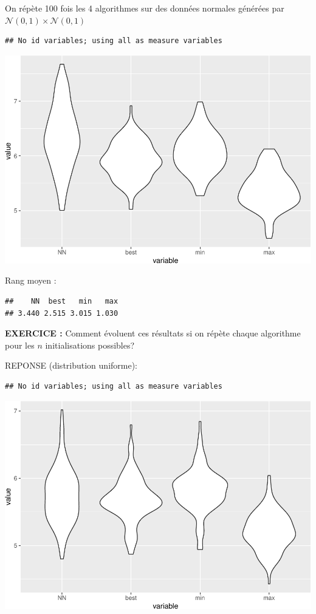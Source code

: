 \documentclass[
]{article}
\begin{document}
On répète 100 fois les 4 algorithmes sur des données normales générées
par \(\mathcal{N}(0,1) \times \mathcal{N}(0,1)\)

\begin{verbatim}
## No id variables; using all as measure variables
\end{verbatim}

\includegraphics{rapport_TSP_files/figure-latex/unnamed-chunk-13-1.pdf}

Rang moyen :

\begin{verbatim}
##    NN  best   min   max 
## 3.440 2.515 3.015 1.030
\end{verbatim}

\textbf{EXERCICE :} Comment évoluent ces résultats si on répète chaque
algorithme pour les \(n\) initialisations possibles?

REPONSE (distribution uniforme):

\begin{verbatim}
## No id variables; using all as measure variables
\end{verbatim}

\includegraphics{rapport_TSP_files/figure-latex/unnamed-chunk-16-1.pdf}
\end{document}
